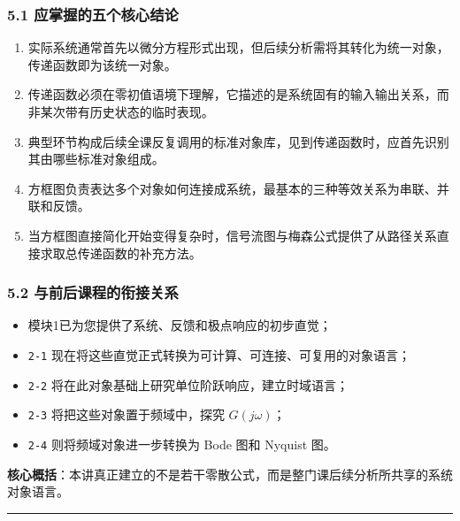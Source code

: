\documentclass[
  11pt]{article}
\providecommand{\tightlist}{%
  \setlength{\itemsep}{0pt}\setlength{\parskip}{0pt}}
\renewenvironment{quote}
  {\begin{HandoutQuoteBox}\small\color{TitleBlue}\noindent\ignorespaces}
  {\end{HandoutQuoteBox}}
\begin{document}
\subsubsection{5.1
应掌握的五个核心结论}\label{ux5e94ux638cux63e1ux7684ux4e94ux4e2aux6838ux5fc3ux7ed3ux8bba}

\begin{enumerate}
\def\labelenumi{\arabic{enumi}.}
\tightlist
\item
  实际系统通常首先以微分方程形式出现，但后续分析需将其转化为统一对象，传递函数即为该统一对象。
\item
  传递函数必须在零初值语境下理解，它描述的是系统固有的输入输出关系，而非某次带有历史状态的临时表现。
\item
  典型环节构成后续全课反复调用的标准对象库，见到传递函数时，应首先识别其由哪些标准对象组成。
\item
  方框图负责表达多个对象如何连接成系统，最基本的三种等效关系为串联、并联和反馈。
\item
  当方框图直接简化开始变得复杂时，信号流图与梅森公式提供了从路径关系直接求取总传递函数的补充方法。
\end{enumerate}

\subsubsection{5.2
与前后课程的衔接关系}\label{ux4e0eux524dux540eux8bfeux7a0bux7684ux8854ux63a5ux5173ux7cfb}

\begin{itemize}
\tightlist
\item
  模块1已为您提供了系统、反馈和极点响应的初步直觉；
\item
  \texttt{2-1}
  现在将这些直觉正式转换为可计算、可连接、可复用的对象语言；
\item
  \texttt{2-2} 将在此对象基础上研究单位阶跃响应，建立时域语言；
\item
  \texttt{2-3} 将把这些对象置于频域中，探究 \(G(j\omega)\)；
\item
  \texttt{2-4} 则将频域对象进一步转换为 Bode 图和 Nyquist 图。
\end{itemize}

\begin{quote}
\textbf{核心概括}：本讲真正建立的不是若干零散公式，而是整门课后续分析所共享的系统对象语言。
\end{quote}

\begin{center}\rule{0.5\linewidth}{0.5pt}\end{center}
\end{document}
